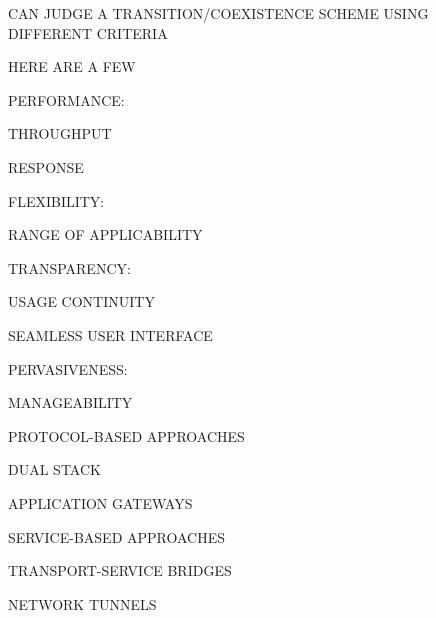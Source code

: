 \begin{bwslide}

\begin{nrtc}
\item	CAN JUDGE A TRANSITION/COEXISTENCE SCHEME USING DIFFERENT
	CRITERIA

\item	HERE ARE A FEW
    \begin{nrtc}
    \item	PERFORMANCE:
	\begin{nrtc}
	\item	THROUGHPUT

	\item	RESPONSE
	\end{nrtc}

    \item	FLEXIBILITY:
	\begin{nrtc}
	\item	RANGE OF APPLICABILITY
	\end{nrtc}

    \item	TRANSPARENCY:
	\begin{nrtc}
	\item	USAGE CONTINUITY

	\item	SEAMLESS USER INTERFACE
	\end{nrtc}

    \item	PERVASIVENESS:
	\begin{nrtc}
	\item	MANAGEABILITY
	\end{nrtc}
    \end{nrtc}
\end{nrtc}
\end{bwslide}


\begin{bwslide}

\begin{nrtc}
\item	PROTOCOL-BASED APPROACHES
    \begin{nrtc}
    \item	DUAL STACK

    \item	APPLICATION GATEWAYS
    \end{nrtc}

\item	SERVICE-BASED APPROACHES
    \begin{nrtc}
    \item	TRANSPORT-SERVICE BRIDGES

    \item	NETWORK TUNNELS
    \end{nrtc}
\end{nrtc}
\end{bwslide}


